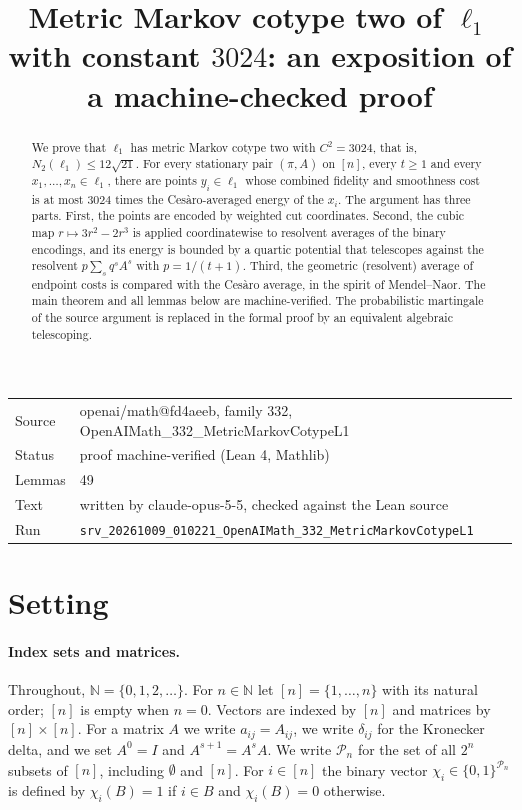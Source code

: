 \documentclass[11pt]{article}
\title{Metric Markov cotype two of $\ell_1$ with constant $3024$: an exposition of a machine-checked proof}
\date{}
\theoremstyle{definition}
\theoremstyle{remark}
\newcommand{\N}{\mathbb{N}}
\newcommand{\Pn}{\mathcal{P}_n}
\begin{document}
\maketitle
\begin{abstract}
We prove that $\ell_1$ has metric Markov cotype two with $C^2=3024$, that is, $N_2(\ell_1)\le 12\sqrt{21}$. For every stationary pair $(\pi,A)$ on $[n]$, every $t\ge 1$ and every $x_1,\dots,x_n\in\ell_1$, there are points $y_i\in\ell_1$ whose combined fidelity and smoothness cost is at most $3024$ times the Ces\`aro-averaged energy of the $x_i$. The argument has three parts. First, the points are encoded by weighted cut coordinates. Second, the cubic map $r\mapsto 3r^2-2r^3$ is applied coordinatewise to resolvent averages of the binary encodings, and its energy is bounded by a quartic potential that telescopes against the resolvent $p\sum_s q^sA^s$ with $p=1/(t+1)$. Third, the geometric (resolvent) average of endpoint costs is compared with the Ces\`aro average, in the spirit of Mendel--Naor. The main theorem and all lemmas below are machine-verified. The probabilistic martingale of the source argument is replaced in the formal proof by an equivalent algebraic telescoping.
\end{abstract}

\begin{center}\small
\begin{tabular}{@{}ll@{}}
\toprule
Source & openai/math@fd4aeeb, family 332, OpenAIMath\_332\_MetricMarkovCotypeL1 \\
Status & proof machine-verified (Lean 4, Mathlib) \\
Lemmas & 49 \\
Text & written by claude-opus-5-5, checked against the Lean source \\
Run & \texttt{srv\_20261009\_010221\_OpenAIMath\_332\_MetricMarkovCotypeL1} \\
\bottomrule
\end{tabular}
\end{center}

\tableofcontents

\section{Setting}

\paragraph{Index sets and matrices.}
Throughout, $\N=\{0,1,2,\dots\}$. For $n\in\N$ let $[n]=\{1,\dots,n\}$ with its natural order; $[n]$ is empty when $n=0$. Vectors are indexed by $[n]$ and matrices by $[n]\times[n]$. For a matrix $A$ we write $a_{ij}=A_{ij}$, we write $\delta_{ij}$ for the Kronecker delta, and we set $A^0=I$ and $A^{s+1}=A^sA$. We write $\Pn$ for the set of all $2^n$ subsets of $[n]$, including $\emptyset$ and $[n]$. For $i\in[n]$ the binary vector $\chi_i\in\{0,1\}^{\Pn}$ is defined by $\chi_i(B)=1$ if $i\in B$ and $\chi_i(B)=0$ otherwise.
\end{document}
